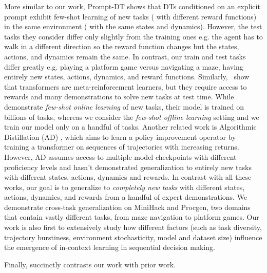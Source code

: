 More similar to our work, Prompt-DT \cite{prompt_dt} shows that DTs conditioned on an explicit prompt exhibit few-shot learning of new tasks (\ie{} with different reward functions) in the same environment (\ie{} with the same states and dynamics). However, the test tasks they consider differ only slightly from the training ones e.g. the agent has to walk in a different direction so the reward function changes but the states, actions, and dynamics remain the same. In contrast, our train and test tasks differ greatly e.g. playing a platform game versus navigating a maze, having entirely new states, actions, dynamics, and reward functions. Similarly,~\cite{melo2022transformers} show that transformers are meta-reinforcement learners, but they require access to rewards and many demonstrations to solve new tasks at test time. While~\cite{team2023humantimescale} demonstrate \textit{few-shot online learning} of new tasks, their model is trained on billions of tasks, whereas we consider the \textit{few-shot offline learning} setting and we train our model only on a handful of tasks. Another related work is Algorithmic Distillation (AD) \cite{algo_dist}, which aims to learn a policy improvement operator by training a transformer on sequences of trajectories with increasing returns. However, AD assumes access to multiple model checkpoints with different proficiency levels and hasn't demonstrated generalization to entirely new tasks with different states, actions, dynamics and rewards. In contrast with all these works, our goal is to generalize to \textit{completely new tasks} with different states, actions, dynamics, and rewards from a handful of expert demonstrations. We demonstrate cross-task generalization on MiniHack and Procgen, two domains that contain vastly different tasks, from maze navigation to platform games. Our work is also first to extensively study how different factors (such as task diversity, trajectory burstiness, environment stochasticity, model and dataset size) influence the emergence of in-context learning in sequential decision making.

Finally,  succinctly contrasts our work with prior work. 


